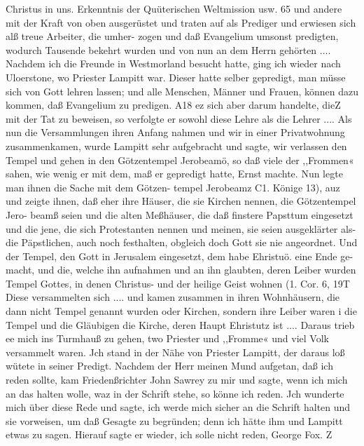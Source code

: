 Christus in uns. Erkenntnis der Quüterischen Weltmission usw. 65
und andere mit der Kraft von oben ausgerüstet und traten auf
als Prediger und erwiesen sich alß treue Arbeiter, die umher-
zogen und daß Evangelium umsonst predigten, wodurch Tausende
bekehrt wurden und von nun an dem Herrn gehörten ....
Nachdem ich die Freunde in Westmorland besucht hatte, ging
ich wieder nach Uloerstone, wo Priester Lampitt war. Dieser
hatte selber gepredigt, man müsse sich von Gott lehren lassen;
und alle Menschen, Männer und Frauen, können dazu kommen,
daß Evangelium zu predigen. A18 ez sich aber darum handelte,
dieZ mit der Tat zu beweisen, so verfolgte er sowohl diese Lehre
als die Lehrer .... Als nun die Versammlungen ihren Anfang
nahmen und wir in einer Privatwohnung zusammenkamen, wurde
Lampitt sehr aufgebracht und sagte, wir verlassen den Tempel
und gehen in den Götzentempel Jerobeamö, so daß viele der
,,Frommen« sahen, wie wenig er mit dem, maß er gepredigt hatte,
Ernst machte. Nun legte man ihnen die Sache mit dem Götzen-
tempel Jerobeamz C1. Könige 13), auz und zeigte ihnen, daß
eher ihre Häuser, die sie Kirchen nennen, die Götzentempel Jero-
beamß seien und die alten Meßhäuser, die daß finstere Papsttum
eingesetzt und die jene, die sich Protestanten nennen und meinen,
sie seien ausgeklärter als- die Päpstlichen, auch noch festhalten,
obgleich doch Gott sie nie angeordnet. Und der Tempel, den
Gott in Jerusalem eingesetzt, dem habe Ehristuö. eine Ende ge-
macht, und die, welche ihn aufnahmen und an ihn glaubten, deren
Leiber wurden Tempel Gottes, in denen Christus- und der heilige
Geist wohnen (1. Cor. 6, 19T Diese versammelten sich ....
und kamen zusammen in ihren Wohnhäusern, die dann nicht
Tempel genannt wurden oder Kirchen, sondern ihre Leiber waren
i die Tempel und die Gläubigen die Kirche, deren Haupt Ehristutz
ist .... Daraus trieb ee mich ins Turmhauß zu gehen, two Priester
und ,,Fromme« und viel Volk versammelt waren. Jch stand in der
Nähe von Priester Lampitt, der daraus loß wütete in seiner
Predigt. Nachdem der Herr meinen Mund aufgetan, daß ich
reden sollte, kam Friedenßrichter John Sawrey zu mir und sagte,
wenn ich mich an das halten wolle, waz in der Schrift stehe,
so könne ich reden. Jch wunderte mich über diese Rede und sagte,
ich werde mich sicher an die Schrift halten und sie vorweisen,
um daß Gesagte zu begründen; denn ich hätte ihm und Lampitt
etwas zu sagen. Hierauf sagte er wieder, ich solle nicht reden,
George Fox. Z


